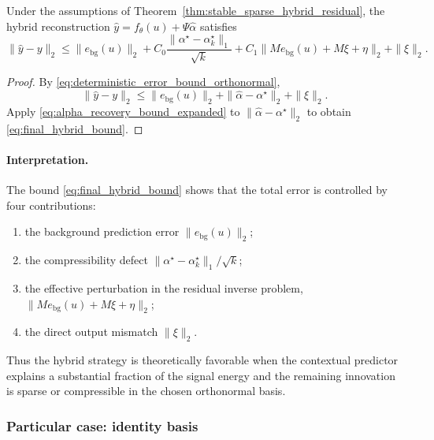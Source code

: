 \begin{corollary}
\label{cor:hybrid_reconstruction_bound}
Under the assumptions of Theorem~\ref{thm:stable_sparse_hybrid_residual}, the hybrid reconstruction $\widehat{y}=f_\theta(u)+\Psi\widehat{\alpha}$ satisfies
\begin{equation}
  \|\widehat{y}-y\|_2
  \le
  \|e_{\mathrm{bg}}(u)\|_2
  +
  C_0 \frac{\|\alpha^\star-\alpha^\star_k\|_1}{\sqrt{k}}
  +
  C_1 \|M e_{\mathrm{bg}}(u) + M\xi + \eta\|_2
  +
  \|\xi\|_2.
  \label{eq:final_hybrid_bound}
\end{equation}
\end{corollary}

\begin{proof}
By \eqref{eq:deterministic_error_bound_orthonormal},
\[
  \|\widehat{y}-y\|_2
  \le
  \|e_{\mathrm{bg}}(u)\|_2 + \|\widehat{\alpha}-\alpha^\star\|_2 + \|\xi\|_2.
\]
Apply \eqref{eq:alpha_recovery_bound_expanded} to $\|\widehat{\alpha}-\alpha^\star\|_2$ to obtain \eqref{eq:final_hybrid_bound}.
\end{proof}

\paragraph{Interpretation.}
The bound \eqref{eq:final_hybrid_bound} shows that the total error is controlled by four contributions:
\begin{enumerate}
  \item the background prediction error $\|e_{\mathrm{bg}}(u)\|_2$;
  \item the compressibility defect $\|\alpha^\star-\alpha^\star_k\|_1/\sqrt{k}$;
  \item the effective perturbation in the residual inverse problem, $\|M e_{\mathrm{bg}}(u)+M\xi+\eta\|_2$;
  \item the direct output mismatch $\|\xi\|_2$.
\end{enumerate}
Thus the hybrid strategy is theoretically favorable when the contextual predictor explains a substantial fraction of the signal energy and the remaining innovation is sparse or compressible in the chosen orthonormal basis.

\subsubsection{Particular case: identity basis}

